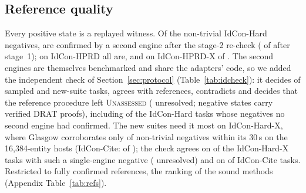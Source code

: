 \subsection{Reference quality}
\label{sec:refquality}
Every positive state is a replayed witness. Of the \hardNegRone{} non-trivial IdCon-Hard negatives, \hardNegRoneCorroborated{} are confirmed by a second engine after the stage-2 re-check (\hardNegVoneCorroborated{} of \hardNegVone{} after stage~1); on IdCon-HPRD all \hprdNegRone{} are, and on IdCon-HPRD-X \hprdxNegRoneCorroborated{} of \hprdxNegRone{}. The second engines are themselves benchmarked and share the adapters' code, so we added the independent check of Section~\ref{sec:protocol} (Table~\ref{tab:idcheck}): it decides \idcDecided{} of \idcTasks{} sampled and new-suite tasks, agrees with \idcAgree{} references, contradicts \idcDisagree{} and decides \idcSettles{} that the reference procedure left \textsc{Unassessed} (\idcUnresolved{} unresolved; \idcDrat{} negative states carry verified DRAT proofs), including \idcUnconfAgree{} of the \idcUnconfTasks{} IdCon-Hard tasks whose negatives no second engine had confirmed. The new suites need it most on IdCon-Hard-X, where Glasgow corroborates only \hardxNegCorroborated{} of \hardxNeg{} non-trivial negatives within its 30\,s on the 16,384-entity hosts (IdCon-Cite: \citeNegCorroborated{} of \citeNeg{}); the check agrees on \idcHardxSingleAgree{} of the \idcHardxSingleTasks{} IdCon-Hard-X tasks with such a single-engine negative (\idcHardxSingleUnresolved{} unresolved) and on \idcCiteAgree{} of \idcCiteTasks{} IdCon-Cite tasks. Restricted to fully confirmed references, the ranking of the sound methods  (Appendix Table~\ref{tab:refs}).
